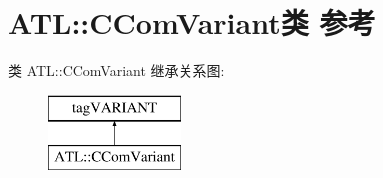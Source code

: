 \hypertarget{class_a_t_l_1_1_c_com_variant}{}\section{A\+TL\+:\+:C\+Com\+Variant类 参考}
\label{class_a_t_l_1_1_c_com_variant}
类 A\+TL\+:\+:C\+Com\+Variant 继承关系图\+:\begin{figure}[H]
\begin{center}
\leavevmode
\includegraphics[height=2.000000cm]{class_a_t_l_1_1_c_com_variant}
\end{center}
\end{figure}
